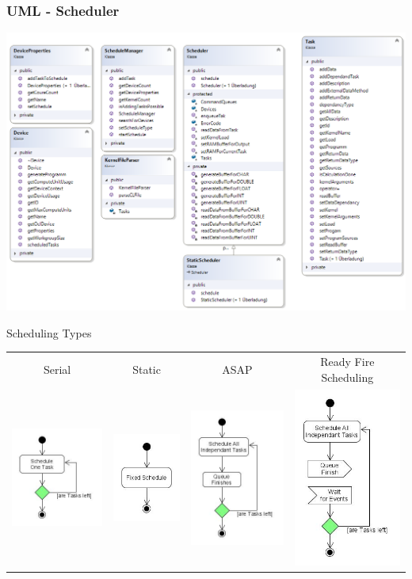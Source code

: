 \documentclass{beamer}
\begin{document}
\begin{frame}
    \frametitle{UML - Scheduler}
    \includegraphics[width=.8\textwidth]{res/ClassDiagramScheduler.png}
\end{frame}
\begin{frame}{Scheduling Types}
	\begin{tabular}{c|c|c|c}
		Serial & Static & ASAP & Ready Fire Scheduling\\
		\includegraphics[width=.2\textwidth]{res/SerialScheduling.jpg}&
		\includegraphics[width=.2\textwidth]{res/StaticScheduling.jpg}&
		\includegraphics[width=.2\textwidth]{res/ASAPScheduling.jpg}&
		\includegraphics[width=.2\textwidth]{res/RFScheduling.jpg}
	\end{tabular}
\end{frame}
\end{document}
